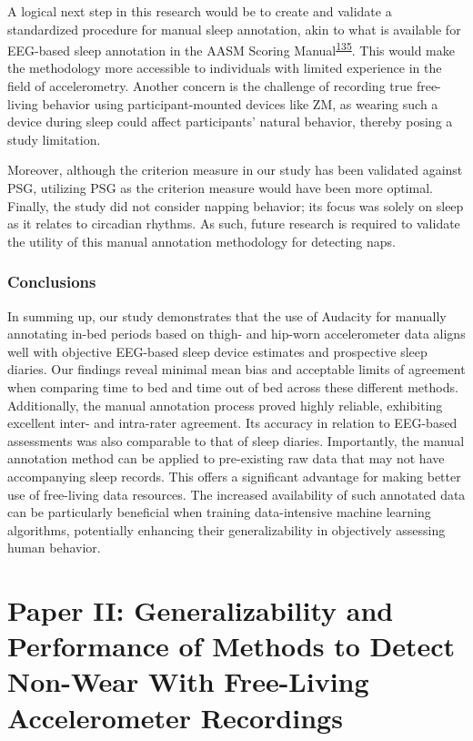 \documentclass[
  10pt,
]{scrbook}
\begin{document}
A logical next step in this research would be to create and validate a
standardized procedure for manual sleep annotation, akin to what is
available for EEG-based sleep annotation in the AASM Scoring
Manual\textsuperscript{\protect\hyperlink{ref-aasm}{135}}. This would
make the methodology more accessible to individuals with limited
experience in the field of accelerometry. Another concern is the
challenge of recording true free-living behavior using
participant-mounted devices like ZM, as wearing such a device during
sleep could affect participants' natural behavior, thereby posing a
study limitation.

Moreover, although the criterion measure in our study has been validated
against PSG, utilizing PSG as the criterion measure would have been more
optimal. Finally, the study did not consider napping behavior; its focus
was solely on sleep as it relates to circadian rhythms. As such, future
research is required to validate the utility of this manual annotation
methodology for detecting naps.

\hypertarget{conclusions}{%
\subsection{Conclusions}\label{conclusions}}

In summing up, our study demonstrates that the use of Audacity for
manually annotating in-bed periods based on thigh- and hip-worn
accelerometer data aligns well with objective EEG-based sleep device
estimates and prospective sleep diaries. Our findings reveal minimal
mean bias and acceptable limits of agreement when comparing time to bed
and time out of bed across these different methods. Additionally, the
manual annotation process proved highly reliable, exhibiting excellent
inter- and intra-rater agreement. Its accuracy in relation to EEG-based
assessments was also comparable to that of sleep diaries. Importantly,
the manual annotation method can be applied to pre-existing raw data
that may not have accompanying sleep records. This offers a significant
advantage for making better use of free-living data resources. The
increased availability of such annotated data can be particularly
beneficial when training data-intensive machine learning algorithms,
potentially enhancing their generalizability in objectively assessing
human behavior.

\newpage

\hypertarget{paper-ii-generalizability-and-performance-of-methods-to-detect-non-wear-with-free-living-accelerometer-recordings}{%
\chapter{Paper II: Generalizability and Performance of Methods to Detect
Non-Wear With Free-Living Accelerometer
Recordings}\label{paper-ii-generalizability-and-performance-of-methods-to-detect-non-wear-with-free-living-accelerometer-recordings}}
\end{document}
